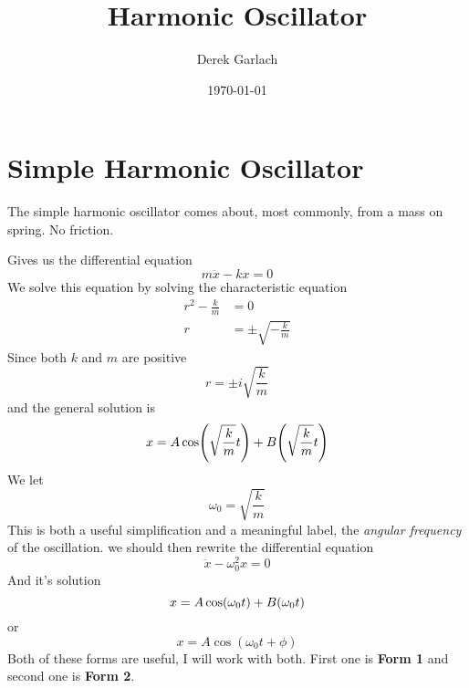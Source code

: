 \documentclass{article}
\author{Derek Garlach}
\title{Harmonic Oscillator}
\date{\today}
\let\sin\relax
\DeclareMathOperator{\sin}{\smash{\mathrm{sin}}}
\begin{document}
\maketitle
\section{Simple Harmonic Oscillator}
The simple harmonic oscillator comes about, most commonly, from a mass on spring. No friction.
\begin{center}
\end{center}
Gives us the differential equation
\begin{equation*}
    m\ddot{x} - kx = 0
\end{equation*}
We solve this equation by solving the characteristic equation
\begin{align*}
    r^2 - \frac{k}{m} &= 0 \\ 
    r &= \pm \sqrt{-\frac{k}{m}}
\end{align*}
Since both $k$ and $m$ are positive
\begin{equation*}
    r = \pm i \sqrt{\frac{k}{m}}
\end{equation*}
and the general solution is
\begin{equation*}
    x = A\cos\!\left(\sqrt{\frac{k}{m}}t\right) + B\sin\!\left(\sqrt{\frac{k}{m}}t\right)
\end{equation*}
We let 
\begin{equation*}
    \omega_0 = \sqrt{\frac{k}{m}}
\end{equation*}
This is both a useful simplification and a meaningful label, the \textit{angular frequency} of the oscillation. we should then rewrite the differential equation
\begin{equation*}
    \ddot{x} - \omega_0^2x = 0
\end{equation*}
And it's solution
\begin{equation*}
    x = A\cos(\omega_0t) + B\sin(\omega_0t)
\end{equation*}
or
\begin{equation*}
    x = A\cos(\omega_0t + \phi)
\end{equation*}
Both of these forms are useful, I will work with both. First one is \textbf{Form 1} and second one is \textbf{Form 2}.
\end{document}
